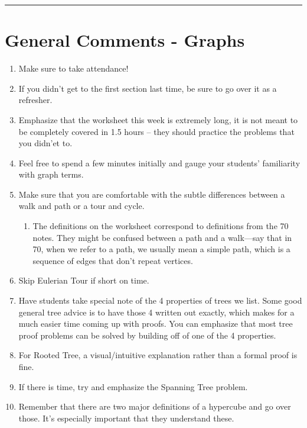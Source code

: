 \documentclass{exam}
\title{}
\date{Graphs, Trees, Hypercubes, Bijections, FLT, Modular Arithmetic}
\begin{document}
\maketitle
\rule{\textwidth}{0.15em}
\fontsize{12}{15}\selectfont
\thispagestyle{empty}


\section{General Comments - Graphs}
\begin{enumerate}
\item Make sure to take attendance!
\item If you didn't get to the first section last time, be sure to go over it as a refresher.
\item Emphasize that the worksheet this week is extremely long, it is not meant to be completely covered in 1.5 hours -- they should practice the problems that you didn’et to.
\item Feel free to spend a few minutes initially and gauge your students' familiarity with graph terms.
\item Make sure that you are comfortable with the subtle differences between a walk and path or a tour and cycle. 
\begin{enumerate}
	\item The definitions on the worksheet correspond to definitions from the 70 notes. They might be confused between a path and a walk---say that in 70, when we refer to a path, we usually mean a simple path, which is a sequence of edges that don't repeat vertices. 
\end{enumerate}
\item Skip Eulerian Tour if short on time.
\item Have students take special note of the 4 properties of trees we list. Some good general tree advice is to have those 4 written out exactly, which makes for a much easier time coming up with proofs. You can emphasize that most tree proof problems can be solved by building off of one of the 4 properties.
\item For Rooted Tree, a visual/intuitive explanation rather than a formal proof is fine. 
\item If there is time, try and emphasize the Spanning Tree problem.
\item Remember that there are two major definitions of a hypercube and go over those. It's especially important that they understand these. 
 
\end{enumerate}
\end{document}
